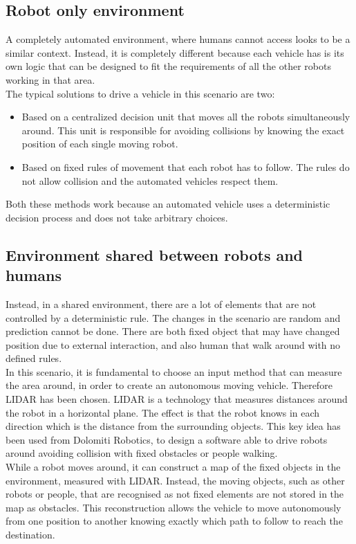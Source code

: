 \subsection{Robot only environment}
A completely automated environment, where humans cannot access looks to be a similar context. Instead, it is completely different because each vehicle has is its own logic that can be designed to fit the requirements of all the other robots working in that area.\\
The typical solutions to drive a vehicle in this scenario are two:
\begin{itemize}
	\item Based on a centralized decision unit that moves all the robots simultaneously around. This unit is responsible for avoiding collisions by knowing the exact position of each single moving robot.
	\item Based on fixed rules of movement that each robot has to follow. The rules do not allow collision and the automated vehicles respect them.
\end{itemize}
Both these methods work because an automated vehicle uses a deterministic decision process and does not take arbitrary choices.

\subsection{Environment shared between robots and humans}
Instead, in a shared environment, there are a lot of elements that are not controlled by a deterministic rule. The changes in the scenario are random and prediction cannot be done. There are both fixed object that may have changed position due to external interaction, and also human that walk around with no defined rules.\\
In this scenario, it is fundamental to choose an input method that can measure the area around, in order to create an autonomous moving vehicle. Therefore LIDAR has been chosen. LIDAR is a technology that measures distances around the robot in a horizontal plane. The effect is that the robot knows in each direction which is the distance from the surrounding objects. This key idea has been used from Dolomiti Robotics, to design a software able to drive robots around avoiding collision with fixed obstacles or people walking.\\
While a robot moves around, it can construct a map of the fixed objects in the environment, measured with LIDAR. Instead, the moving objects, such as other robots or people, that are recognised as not fixed elements are not stored in the map as obstacles. This reconstruction allows the vehicle to move autonomously from one position to another knowing exactly which path to follow to reach the destination.

